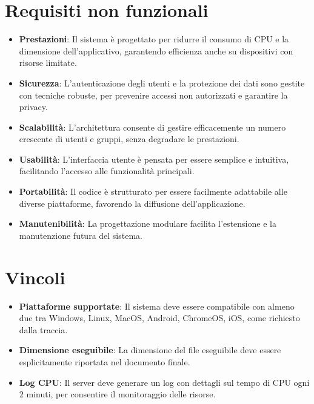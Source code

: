 \section{Requisiti non funzionali}
\begin{itemize}
	\item \textbf{Prestazioni}: Il sistema è progettato per ridurre il consumo di CPU e la dimensione dell'applicativo, garantendo efficienza anche su dispositivi con risorse limitate.
	\item \textbf{Sicurezza}: L'autenticazione degli utenti e la protezione dei dati sono gestite con tecniche robuste, per prevenire accessi non autorizzati e garantire la privacy.
	\item \textbf{Scalabilità}: L'architettura consente di gestire efficacemente un numero crescente di utenti e gruppi, senza degradare le prestazioni.
	\item \textbf{Usabilità}: L'interfaccia utente è pensata per essere semplice e intuitiva, facilitando l'accesso alle funzionalità principali.
	\item \textbf{Portabilità}: Il codice è strutturato per essere facilmente adattabile alle diverse piattaforme, favorendo la diffusione dell'applicazione.
	\item \textbf{Manutenibilità}: La progettazione modulare facilita l'estensione e la manutenzione futura del sistema.
\end{itemize}

\section{Vincoli}
\begin{itemize}
	\item \textbf{Piattaforme supportate}: Il sistema deve essere compatibile con almeno due tra Windows, Linux, MacOS, Android, ChromeOS, iOS, come richiesto dalla traccia.
	\item \textbf{Dimensione eseguibile}: La dimensione del file eseguibile deve essere esplicitamente riportata nel documento finale.
	\item \textbf{Log CPU}: Il server deve generare un log con dettagli sul tempo di CPU ogni 2 minuti, per consentire il monitoraggio delle risorse.
\end{itemize}

